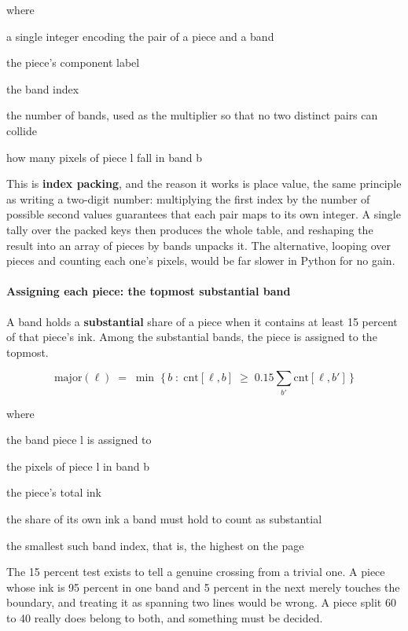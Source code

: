 \noindent where
\begin{description}[leftmargin=2.4em,style=nextline,font=\normalfont\ttfamily]\setlength\itemsep{1pt}
  \item[{$\mathrm{key}$}] \normalfont a single integer encoding the pair of a piece and a band
  \item[{$\ell$}] \normalfont the piece's component label
  \item[{$b$}] \normalfont the band index
  \item[{$L$}] \normalfont the number of bands, used as the multiplier so that no two distinct pairs can collide
  \item[{$\mathrm{cnt}[\ell,b]$}] \normalfont how many pixels of piece l fall in band b
\end{description}
This is \textbf{index packing}, and the reason it works is place value, the same principle as writing a two-digit number: multiplying the first index by the number of possible second values guarantees that each pair maps to its own integer. A single tally over the packed keys then produces the whole table, and reshaping the result into an array of pieces by bands unpacks it. The alternative, looping over pieces and counting each one's pixels, would be far slower in Python for no gain.


\paragraph{Assigning each piece: the topmost substantial band}
A band holds a \textbf{substantial} share of a piece when it contains at least 15 percent of that piece's ink. Among the substantial bands, the piece is assigned to the topmost.


\begin{equation}
\mathrm{major}(\ell) \;=\; \min\;\big\{\, b \;:\; \mathrm{cnt}[\ell,b] \;\ge\; 0.15 \textstyle\sum_{b'} \mathrm{cnt}[\ell,b'] \,\big\}
\end{equation}

\noindent where
\begin{description}[leftmargin=2.4em,style=nextline,font=\normalfont\ttfamily]\setlength\itemsep{1pt}
  \item[{$\mathrm{major}(\ell)$}] \normalfont the band piece l is assigned to
  \item[{$\mathrm{cnt}[\ell,b]$}] \normalfont the pixels of piece l in band b
  \item[{$\sum_{b'} \mathrm{cnt}[\ell,b']$}] \normalfont the piece's total ink
  \item[{$0.15$}] \normalfont the share of its own ink a band must hold to count as substantial
  \item[{$\min$}] \normalfont the smallest such band index, that is, the highest on the page
\end{description}
The 15 percent test exists to tell a genuine crossing from a trivial one. A piece whose ink is 95 percent in one band and 5 percent in the next merely touches the boundary, and treating it as spanning two lines would be wrong. A piece split 60 to 40 really does belong to both, and something must be decided.

